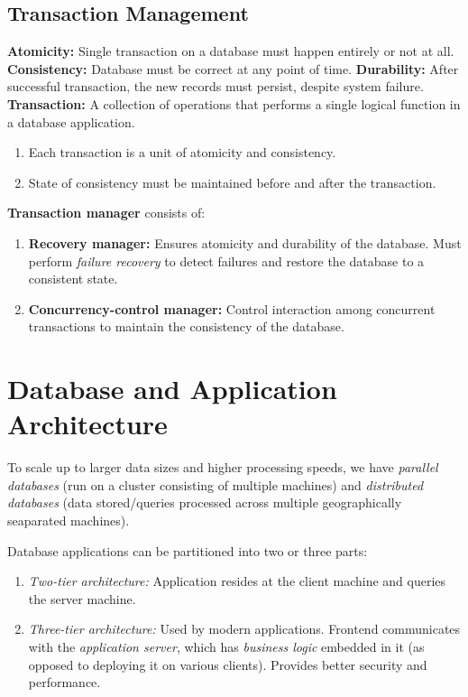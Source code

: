 \documentclass[journal,12pt,twocolumn]{IEEEtran}
\begin{document}
\subsection{Transaction Management}

\textbf{Atomicity:} Single transaction on a database must happen entirely or 
not at all.
\textbf{Consistency:} Database must be correct at any point of time.
\textbf{Durability:} After successful transaction, the new records must persist,
despite system failure.
\textbf{Transaction:} A collection of operations that performs a single logical
function in a database application.

\begin{enumerate}
    \item Each transaction is a unit of atomicity and consistency.
    \item State of consistency must be maintained before and after the 
    transaction.
\end{enumerate}

\textbf{Transaction manager} consists of:
\begin{enumerate}
    \item \textbf{Recovery manager:} Ensures atomicity and durability of the 
    database. Must perform \textit{failure recovery} to detect failures and 
    restore the database to a consistent state.
    \item \textbf{Concurrency-control manager:} Control interaction among 
    concurrent transactions to maintain the consistency of the database.
\end{enumerate}

\section{Database and Application Architecture}

To scale up to larger data sizes and higher processing speeds, we have 
\textit{parallel databases} (run on a cluster consisting of multiple machines)
and \textit{distributed databases} (data stored/queries processed across 
multiple geographically seaparated machines).

Database applications can be partitioned into two or three parts:
\begin{enumerate}
    \item \textit{Two-tier architecture:} Application resides at the client 
    machine and queries the server machine.
    \item \textit{Three-tier architecture:} Used by modern applications. 
    Frontend communicates with the \textit{application server}, which has 
    \textit{business logic} embedded in it (as opposed to deploying it on 
    various clients). Provides better security and performance.
\end{enumerate}
\end{document}
